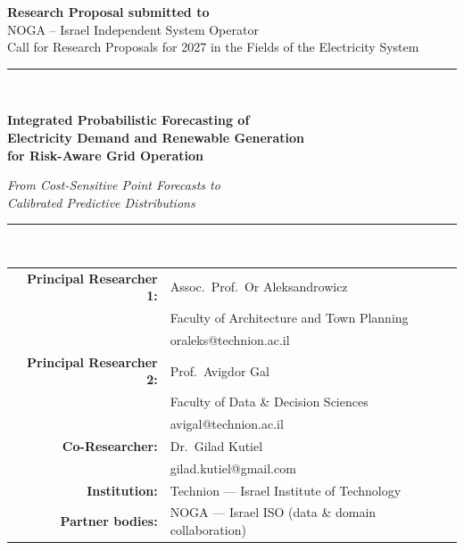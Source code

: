 \documentclass[12pt,a4paper]{article}
\begin{document}
\thispagestyle{empty}
\begingroup
\singlespacing
\begin{center}
    \vspace*{0.2cm}
    {\large\bfseries Research Proposal submitted to}\\[0.2em]
    {\large NOGA -- Israel Independent System Operator}\\[0.3em]
    {\normalsize Call for Research Proposals for 2027 in the Fields of the Electricity System}\\[0.9cm]

    \rule{\textwidth}{1.2pt}\\[0.5cm]
    {\LARGE\bfseries\color{nogablue}
     Integrated Probabilistic Forecasting of\\[0.25em]
     Electricity Demand and Renewable Generation\\[0.25em]
     for Risk-Aware Grid Operation\par}
    \vspace{0.4cm}
    {\large\itshape From Cost-Sensitive Point Forecasts to\\
     Calibrated Predictive Distributions}\\[0.35cm]
    \rule{\textwidth}{1.2pt}\\[0.9cm]

    \begin{tabular}{rl}
        \textbf{Principal Researcher 1:} & Assoc.\ Prof.\ Or Aleksandrowicz \\
                                          & \phantom{}Faculty of Architecture and Town Planning \\
                                          & \phantom{}oraleks@technion.ac.il \\[0.35em]
        \textbf{Principal Researcher 2:} & Prof.\ Avigdor Gal \\
                                          & \phantom{}Faculty of Data \& Decision Sciences \\
                                          & \phantom{}avigal@technion.ac.il \\[0.35em]
        \textbf{Co-Researcher:}          & Dr.\ Gilad Kutiel \\
                                          & \phantom{}gilad.kutiel@gmail.com \\[0.35em]
        \textbf{Institution:}            & Technion --- Israel Institute of Technology \\[0.35em]
        \textbf{Partner bodies:}         & NOGA --- Israel ISO (data \& domain collaboration) \\[0.35em]
    \end{tabular}


\end{center}
\end{document}

